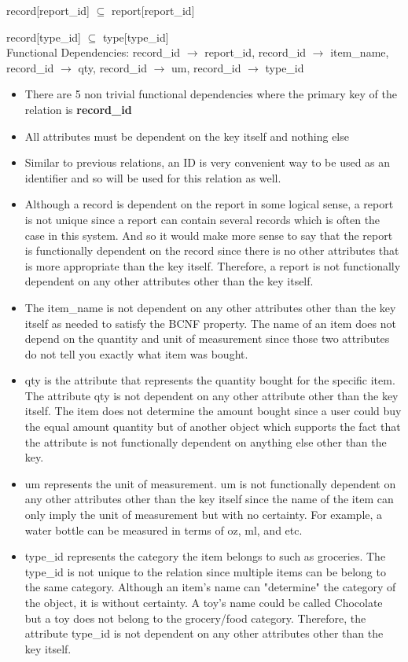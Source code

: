 \documentclass{article}
\begin{document}
record[report\_id] $\subseteq$ report[report\_id]

record[type\_id] $\subseteq$ type[type\_id]
\\

Functional Dependencies: record\_id $\to$ report\_id, record\_id $\to$ item\_name, record\_id $\to$ qty, record\_id $\to$ um, record\_id $\to$ type\_id

\begin{itemize}
    \item There are 5 non trivial functional dependencies where the primary key of the relation is \textbf{record\_id}
    \item All attributes must be dependent on the key itself and nothing else
    \item Similar to previous relations, an ID is very convenient way to be used as an identifier and so will be used for this relation as well. 
    \item Although a record is dependent on the report in some logical sense, a report is not unique since a report can contain several records which is often the case in this system. And so it would make more sense to say that the report is functionally dependent on the record since there is no other attributes that is more appropriate than the key itself. Therefore, a report is not functionally dependent on any other attributes other than the key itself.
    \item The item\_name is not dependent on any other attributes other than the key itself as needed to satisfy the BCNF property. The name of an item does not depend on the quantity and unit of measurement since those two attributes do not tell you exactly what item was bought. 
    \item qty is the attribute that represents the quantity bought for the specific item. The attribute qty is not dependent on any other attribute other than the key itself. The item does not determine the amount bought since a user could buy the equal amount quantity but of another object which supports the fact that the attribute is not functionally dependent on anything else other than the key.
    \item um represents the unit of measurement. um is not functionally dependent on any other attributes other than the key itself since the name of the item can only imply the unit of measurement but with no certainty. For example, a water bottle can be measured in terms of oz, ml, and etc. 
    \item type\_id represents the category the item belongs to such as groceries. The type\_id is not unique to the relation since multiple items can be belong to the same category. Although an item's name can "determine" the category of the object, it is without certainty. A toy's name could be called Chocolate but a toy does not belong to the grocery/food category. Therefore, the attribute type\_id is not dependent on any other attributes other than the key itself.
\end{itemize}
\end{document}

